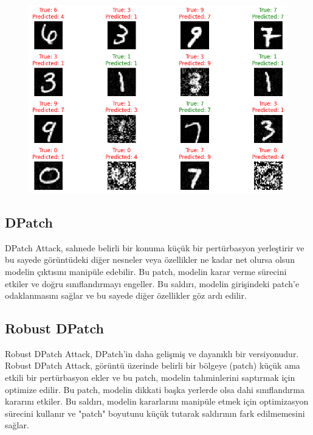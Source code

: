 \newpage

\begin{figure}[h]
    \centering
    \includegraphics[width=1\textwidth]{images/deep_fool_attack_results.png}
    \caption{}
\end{figure}

\newpage

\subsection{DPatch}

DPatch Attack, sahnede belirli bir konuma küçük bir pertürbasyon yerleştirir ve bu sayede görüntüdeki diğer nesneler veya özellikler ne kadar net olursa olsun modelin çıktısını manipüle edebilir. Bu patch, modelin karar verme sürecini etkiler ve doğru sınıflandırmayı engeller. Bu saldırı, modelin girişindeki patch'e odaklanmasını sağlar ve bu sayede diğer özellikler göz ardı edilir.

\newpage

\subsection{Robust DPatch}

Robust DPatch Attack, DPatch'in daha gelişmiş ve dayanıklı bir versiyonudur. Robust DPatch Attack, görüntü üzerinde belirli bir bölgeye (patch) küçük ama etkili bir pertürbasyon ekler ve bu patch, modelin tahminlerini saptırmak için optimize edilir. Bu patch, modelin dikkati başka yerlerde olsa dahi sınıflandırma kararını etkiler. Bu saldırı, modelin kararlarını manipüle etmek için optimizasyon sürecini kullanır ve "patch" boyutunu küçük tutarak saldırının fark edilmemesini sağlar.


